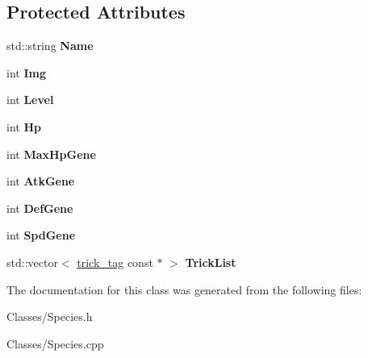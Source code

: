 \subsection*{Protected Attributes}
\begin{DoxyCompactItemize}
\item 
std\+::string {\bfseries Name}\hypertarget{class_c_species_a4ae49cfe79de97715fae5c6f4a248ba3}{}\label{class_c_species_a4ae49cfe79de97715fae5c6f4a248ba3}

\item 
int {\bfseries Img}\hypertarget{class_c_species_a9b2d09eec23e334706990b4c03056483}{}\label{class_c_species_a9b2d09eec23e334706990b4c03056483}

\item 
int {\bfseries Level}\hypertarget{class_c_species_a9312314cc7998f560b62b7dd7f630997}{}\label{class_c_species_a9312314cc7998f560b62b7dd7f630997}

\item 
int {\bfseries Hp}\hypertarget{class_c_species_a864428128364ef09a49bab0a15e0a9ad}{}\label{class_c_species_a864428128364ef09a49bab0a15e0a9ad}

\item 
int {\bfseries Max\+Hp\+Gene}\hypertarget{class_c_species_af8936d33bbf9d4b21918f84943e23813}{}\label{class_c_species_af8936d33bbf9d4b21918f84943e23813}

\item 
int {\bfseries Atk\+Gene}\hypertarget{class_c_species_a66431b002abfd87d4b30f180a46e5e47}{}\label{class_c_species_a66431b002abfd87d4b30f180a46e5e47}

\item 
int {\bfseries Def\+Gene}\hypertarget{class_c_species_a9d1e9f6a98b9e321a82af8cd5ee171b3}{}\label{class_c_species_a9d1e9f6a98b9e321a82af8cd5ee171b3}

\item 
int {\bfseries Spd\+Gene}\hypertarget{class_c_species_a9e1fa2d1be4e70d7a5a701c15d21dfcb}{}\label{class_c_species_a9e1fa2d1be4e70d7a5a701c15d21dfcb}

\item 
std\+::vector$<$ \hyperlink{structtrick__tag}{trick\+\_\+tag} const $\ast$ $>$ {\bfseries Trick\+List}\hypertarget{class_c_species_a5d7cb8805a1f0d8f28280ae62ed4421d}{}\label{class_c_species_a5d7cb8805a1f0d8f28280ae62ed4421d}

\end{DoxyCompactItemize}


The documentation for this class was generated from the following files\+:\begin{DoxyCompactItemize}
\item 
Classes/Species.\+h\item 
Classes/Species.\+cpp\end{DoxyCompactItemize}
